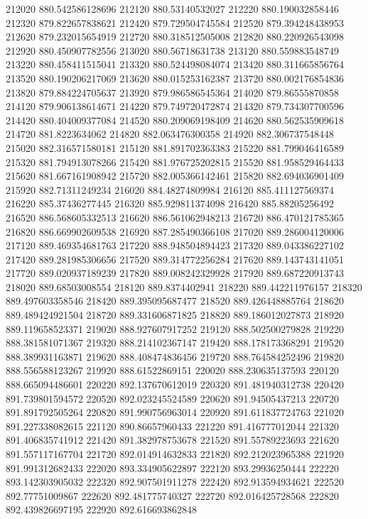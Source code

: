 {212020 880.542586128696
212120 880.53140532027
212220 880.190032858446
212320 879.822657838621
212420 879.729504745584
212520 879.394248438953
212620 879.232015654919
212720 880.318512505008
212820 880.220926543098
212920 880.450907782556
213020 880.56718631738
213120 880.559883548749
213220 880.458411515041
213320 880.524498084074
213420 880.311665856764
213520 880.190206217069
213620 880.015253162387
213720 880.002176854836
213820 879.884224705637
213920 879.986586545364
214020 879.86555870858
214120 879.906138614671
214220 879.749720472874
214320 879.734307700596
214420 880.404009377084
214520 880.209069198409
214620 880.562535909618
214720 881.8223634062
214820 882.063476300358
214920 882.306737548448
215020 882.316571580181
215120 881.891702363383
215220 881.799046416589
215320 881.794913078266
215420 881.976725202815
215520 881.958529464433
215620 881.667161908942
215720 882.005366142461
215820 882.694036901409
215920 882.71311249234
216020 884.48274809984
216120 885.411127569374
216220 885.37436277445
216320 885.929811374098
216420 885.88205256492
216520 886.568605332513
216620 886.561062948213
216720 886.470121785365
216820 886.669902609538
216920 887.285490366108
217020 889.286004120006
217120 889.469354681763
217220 888.948504894423
217320 889.043386227102
217420 889.281985306656
217520 889.314772256284
217620 889.143743141051
217720 889.020937189239
217820 889.008242329928
217920 889.687220913743
218020 889.68503008554
218120 889.8374402941
218220 889.442211976157
218320 889.497603358546
218420 889.395095687477
218520 889.426448885764
218620 889.489424921504
218720 889.331606871825
218820 889.186012027873
218920 889.119658523371
219020 888.927607917252
219120 888.502500279828
219220 888.381581071367
219320 888.214102367147
219420 888.178173368291
219520 888.389931163871
219620 888.408474836456
219720 888.764584252496
219820 888.556588123267
219920 888.61522869151
220020 888.230635137593
220120 888.665094486601
220220 892.137670612019
220320 891.481940312738
220420 891.739801594572
220520 892.023245524589
220620 891.94505437213
220720 891.891792505264
220820 891.990756963014
220920 891.611837724763
221020 891.227338082615
221120 890.86657960433
221220 891.416777012044
221320 891.406835741912
221420 891.382978753678
221520 891.55789223693
221620 891.557117167704
221720 892.014914632833
221820 892.212023965388
221920 891.991312682433
222020 893.334905622897
222120 893.29936250444
222220 893.142303905032
222320 892.907501911278
222420 892.913594934621
222520 892.77751009867
222620 892.481775740327
222720 892.016425728568
222820 892.439826697195
222920 892.616693862848
}
